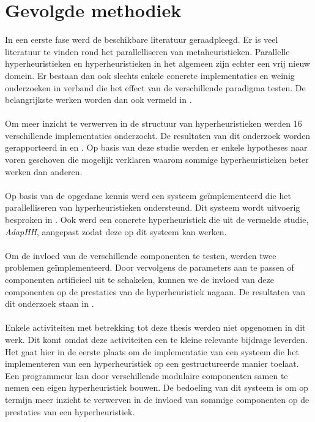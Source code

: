 \section{Gevolgde methodiek}

In een eerste fase werd de beschikbare literatuur geraadpleegd. Er is veel literatuur te vinden rond het parallelliseren van metaheuristieken. Parallelle hyperheuristieken en hyperheuristieken in het algemeen zijn echter een vrij nieuw domein. Er bestaan dan ook slechts enkele concrete implementaties en weinig onderzoeken in verband die het effect van de verschillende paradigma testen. De belangrijkste werken worden dan ook vermeld in .

\paragraph{}
Om meer inzicht te verwerven in de structuur van hyperheuristieken werden 16 verschillende implementaties onderzocht. De resultaten van dit onderzoek worden gerapporteerd in  en . Op basis van deze studie werden er enkele hypotheses naar voren geschoven die mogelijk verklaren waarom sommige hyperheuristieken beter werken dan anderen.

\paragraph{}
Op basis van de opgedane kennis werd een systeem ge\"implementeerd die het parallelliseren van hyperheuristieken ondersteund. Dit systeem wordt uitvoerig besproken in . Ook werd een concrete hyperheuristiek die uit de vermelde studie, \emph{AdapHH}, aangepast zodat deze op dit systeem kan werken.

\paragraph{}
Om de invloed van de verschillende componenten te testen, werden twee problemen ge\"implementeerd. Door vervolgens de parameters aan te passen of componenten artificieel uit te schakelen, kunnen we de invloed van deze componenten op de prestaties van de hyperheuristiek nagaan. De resultaten van dit onderzoek staan in .

\paragraph{}
Enkele activiteiten met betrekking tot deze thesis werden niet opgenomen in dit werk. Dit komt omdat deze activiteiten een te kleine relevante bijdrage leverden. Het gaat hier in de eerste plaats om de implementatie van een systeem die het implementeren van een hyperheuristiek op een gestructureerde manier toelaat. Een programmeur kan door verschillende modulaire componenten samen te nemen een eigen hyperheuristiek bouwen. De bedoeling van dit systeem is om op termijn meer inzicht te verwerven in de invloed van sommige componenten op de prestaties van een hyperheuristiek.

